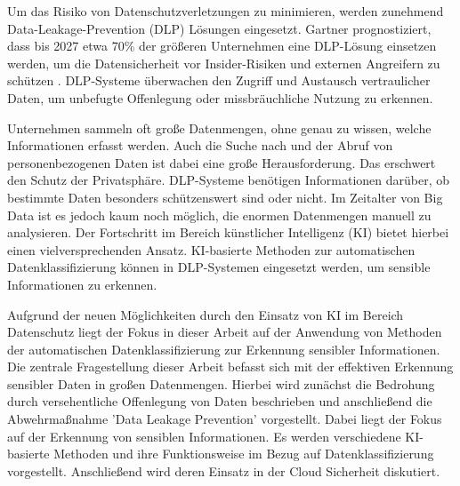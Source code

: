 Um das Risiko von Datenschutzverletzungen zu minimieren, werden zunehmend Data-Leakage-Prevention (DLP) Lösungen eingesetzt. Gartner prognostiziert, dass bis 2027 etwa 70\% der größeren Unternehmen eine DLP-Lösung einsetzen werden, um die Datensicherheit vor Insider-Risiken und externen Angreifern zu schützen \cite{Chugh.2023}. DLP-Systeme überwachen den Zugriff und Austausch vertraulicher Daten, um unbefugte Offenlegung oder missbräuchliche Nutzung zu erkennen.

Unternehmen sammeln oft große Datenmengen, ohne genau zu wissen, welche Informationen erfasst werden. Auch die Suche nach und der Abruf von personenbezogenen Daten ist dabei eine große Herausforderung. Das erschwert den Schutz der Privatsphäre. DLP-Systeme benötigen Informationen darüber, ob bestimmte Daten besonders schützenswert sind oder nicht. Im Zeitalter von Big Data ist es jedoch kaum noch möglich, die enormen Datenmengen manuell zu analysieren. Der Fortschritt im Bereich künstlicher Intelligenz (KI) bietet hierbei einen vielversprechenden Ansatz. KI-basierte Methoden zur automatischen Datenklassifizierung können in DLP-Systemen eingesetzt werden, um sensible Informationen zu erkennen.

Aufgrund der neuen Möglichkeiten durch den Einsatz von KI im Bereich Datenschutz liegt der Fokus in dieser Arbeit auf der Anwendung von Methoden der automatischen Datenklassifizierung zur Erkennung sensibler Informationen. Die zentrale Fragestellung dieser Arbeit befasst sich mit der effektiven Erkennung sensibler Daten in großen Datenmengen. Hierbei wird zunächst die Bedrohung durch versehentliche Offenlegung von Daten beschrieben und anschließend die Abwehrmaßnahme 'Data Leakage Prevention' vorgestellt. Dabei liegt der Fokus auf der Erkennung von sensiblen Informationen. Es werden verschiedene KI-basierte Methoden und ihre Funktionsweise im Bezug auf Datenklassifizierung vorgestellt. Anschließend wird deren Einsatz in der Cloud Sicherheit diskutiert.
